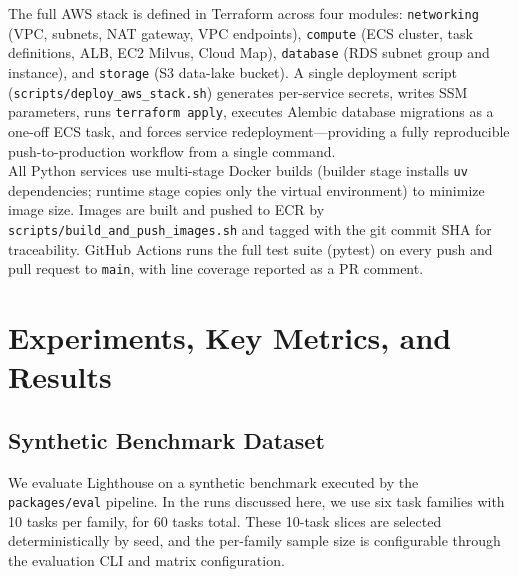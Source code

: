 \documentclass[a4paper,12pt]{article}
\begin{document}
The full AWS stack is defined in Terraform across four modules:
\texttt{networking} (VPC, subnets, NAT gateway, VPC endpoints),
\texttt{compute} (ECS cluster, task definitions, ALB, EC2 Milvus, Cloud Map),
\texttt{database} (RDS subnet group and instance), and
\texttt{storage} (S3 data-lake bucket).
A single deployment script (\texttt{scripts/deploy\_aws\_stack.sh})
generates per-service secrets, writes SSM parameters, runs
\texttt{terraform apply}, executes Alembic database migrations as a
one-off ECS task, and forces service redeployment—providing a fully
reproducible push-to-production workflow from a single command.\\

All Python services use multi-stage Docker builds (builder stage installs
\texttt{uv} dependencies; runtime stage copies only the virtual environment)
to minimize image size.
Images are built and pushed to ECR by
\texttt{scripts/build\_and\_push\_images.sh} and tagged with the git commit
SHA for traceability.
GitHub Actions runs the full test suite (pytest) on every push and pull
request to \texttt{main}, with line coverage reported as a PR comment.



\section{Experiments, Key Metrics, and Results}
\label{sec:experiments}

\subsection{Synthetic Benchmark Dataset}

We evaluate Lighthouse on a synthetic benchmark executed by the \texttt{packages/eval} pipeline. In the runs discussed here, we use six task families with 10 tasks per family, for 60 tasks total. These 10-task slices are selected deterministically by seed, and the per-family sample size is configurable through the evaluation CLI and matrix configuration.\\
\end{document}
